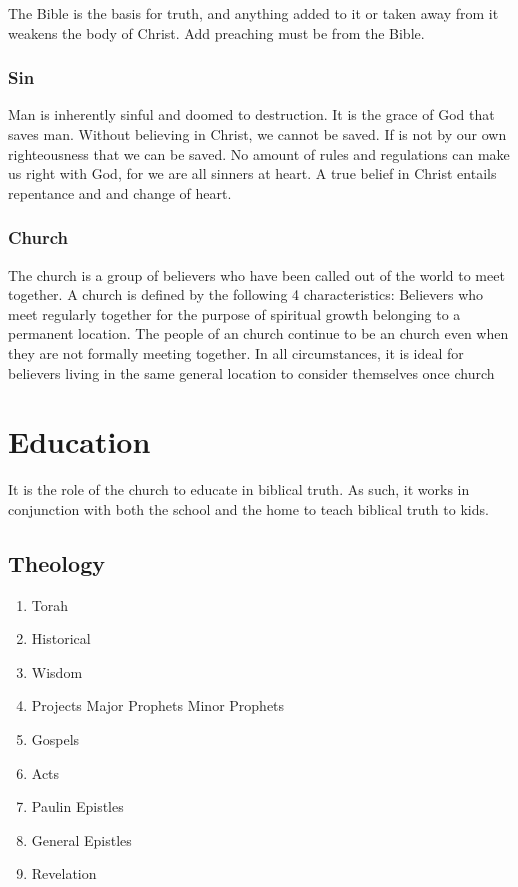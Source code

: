 \documentclass[CSHFoundation.tex]{subfiles}
\begin{document}
The Bible is the basis for truth, and anything added to it or taken away from it weakens the body of Christ. Add preaching must be from the Bible.



\subsubsection{Sin}

Man is inherently sinful and doomed to destruction. It is the grace of God that saves man. Without believing in Christ, we cannot be saved. If is not by our own righteousness that we can be saved. No amount of rules and regulations can make us right with God, for we are all sinners at heart. A true belief in Christ entails repentance and and change of heart.


\subsubsection{Church}

The church is a group of believers who have been called out of the world to meet together. A church is defined by the following 4 characteristics: Believers who meet regularly together for the purpose of spiritual growth belonging to a permanent location. The people of an church continue to be an church even when they are not formally meeting together. In all circumstances, it is ideal for believers living in the same general location to consider themselves once church


\section{Education}

It is the role of the church to educate in biblical truth. As such, it works in conjunction with both the school and the home to teach biblical truth to kids.

\subsection{Theology}

\begin{enumerate}
\item Torah
\item Historical
\item Wisdom
\item Projects
\subitem Major Prophets
\subitem Minor Prophets
\item Gospels
\item Acts
\item Paulin Epistles
\item General Epistles
\item Revelation
\end{enumerate}
\end{document}
